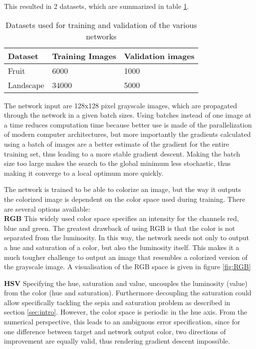 This resulted in 2 datasets, which are summarized in table \ref{tab:dataset}.

\begin{table}[h!]
	\centering
	\caption{Datasets used for training and validation of the various networks}
	\label{tab:dataset}
	\begin{tabular}{|l|l|l|}
		\hline
		Dataset   & Training Images & Validation images \\ \hline
		Fruit     & 6000            & 1000              \\ \hline
		Landscape & 34000           & 5000              \\ \hline
	\end{tabular}
\end{table}

The network input are 128x128 pixel grayscale images, which are propagated through the network in a given batch sizes. Using batches instead of one image at a time reduces computation time because better use is made of the parallelization of modern computer architectures, but more importantly the gradients calculated using a batch of images are a better estimate of the gradient for the entire training set, thus leading to a more stable gradient descent\cite{ioffe2015batch}. Making the batch size too large makes the search to the global minimum less stochastic, thus making it converge to a local optimum more quickly.

The network is trained to be able to colorize an image, but the way it outputs the colorized image is dependent on the color space used during training. There are several options available:\\

\textbf{RGB} This widely used color space specifies an intensity for the channels red, blue and green. The greatest drawback of using RGB is that the color is not separated from the luminosity. In this way, the network needs not only to output a hue and saturation of a color, but also the luminosity itself. This makes it a much tougher challenge to output an image that resembles a colorized version of the grayscale image. A visualisation of the RGB space is given in figure \ref{fig:RGB}

\textbf{HSV} Specifying the hue, saturation and value, uncouples the luminosity (value) from the color (hue and saturation). Furthermore decoupling the saturation could allow specifically tackling the sepia and saturation problem as described in section \ref{sec:intro}. However, the color space is periodic in the hue axis. From the numerical perspective, this leads to an ambiguous error specification, since for one difference between target and network output color, two directions of improvement are equally valid, thus rendering gradient descent impossible.

